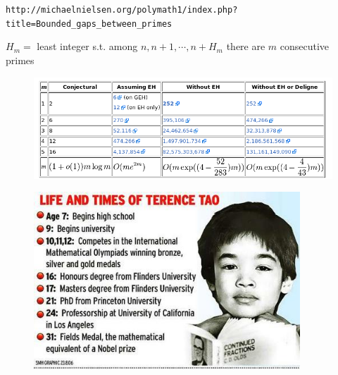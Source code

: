 \documentclass[landscape,display]{powersem} %
\newcommand{\heading}[1]{%
 \begin{center}
  \large\bf
  \shadowbox{{\textcolor{conceptcolor}{#1}}}%
 \end{center}
 \vspace{1ex minus 1ex}}
\begin{document}
\begin{slide}
 \heading{The race of the summer 2013 started on May 14,}

\centerline{\scriptsize{\texttt{http://michaelnielsen.org/polymath1/index.php?title=Bounded\_gaps\_between\_primes}}}\pause

\heading{Race to the solution of a more general problem}\pause

$H_m=$ least integer s.t. among $n,n+1,\cdots,n+H_m$ there are $m$ consecutive primes\pause

\begin{center}\begin{figure}
  \includegraphics[width=12cm]{images/Schermata5.png}
 \end{figure}\end{center}
\end{slide}

\begin{slide}
 \heading{Polymath8 and Terry Tao}

\begin{center}\begin{figure}
  \includegraphics[width=10cm]{images/gr_terencetao_wideweb__470x313,0.jpg}
 \end{figure}\end{center}



\end{slide}
\end{document}
